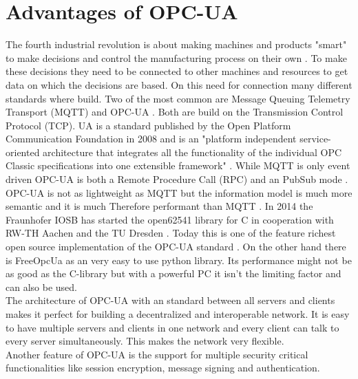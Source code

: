 \documentclass[conference]{IEEEtran}
\begin{document}
\section{Advantages of OPC-UA}
The fourth industrial revolution is about making machines and products "smart" to make decisions and control the manufacturing process on their own \cite{Industry4}.
To make these decisions they need to be connected to other machines and resources to get data on which the decisions are based.
On this need for connection many different standards where build.
Two of the most common are Message Queuing Telemetry Transport (MQTT) and OPC-UA \cite{CommTechnology}.
Both are build on the Transmission Control Protocol (TCP).
UA is a standard published by the Open Platform Communication Foundation in 2008 and is an "platform independent service-oriented architecture that integrates all the functionality of the individual OPC Classic specifications into one extensible framework" \cite{OPCUA}.
While MQTT is only event driven OPC-UA is both a Remote Procedure Call (RPC) and an PubSub mode \cite{OPCUA}. 
OPC-UA is not as lightweight as MQTT but the information model is much more semantic and it is much Therefore performant than MQTT \cite{CommunicationCommarison}.
In 2014 the Fraunhofer IOSB has started the open62541 library for C in cooperation with RW-TH Aachen and the TU Dresden \cite{open62541}.
Today this is one of the feature richest open source implementation of the OPC-UA standard \cite{ComparOPCUAPaper}.
On the other hand there is FreeOpcUa as an very easy to use python library.
Its performance might not be as good as the C-library but with a powerful PC it isn't the limiting factor and can also be used.\\
The architecture of OPC-UA with an standard between all servers and clients makes it perfect for building a decentralized and interoperable network.
It is easy to have multiple servers and clients in one network and every client can talk to every server simultaneously.
This makes the network very flexible.\\

Another feature of OPC-UA is the support for multiple security critical functionalities like session encryption, message signing and authentication. \cite{OPCUA}
\end{document}
